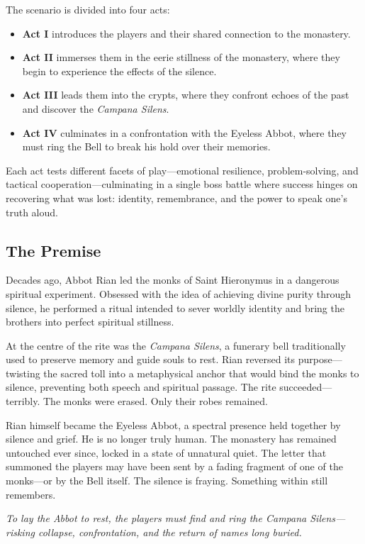 \documentclass[twocolumn,nodeprecatedcode,bg=print]{dndbook/dndbook}
\begin{document}
The scenario is divided into four acts: 
\begin{itemize}
    \item \textbf{Act I} introduces the players and their shared connection to the monastery.
    \item \textbf{Act II} immerses them in the eerie stillness of the monastery, where they begin to experience the effects of the silence.
    \item \textbf{Act III} leads them into the crypts, where they confront echoes of the past and discover the \emph{Campana Silens}.
    \item \textbf{Act IV} culminates in a confrontation with the Eyeless Abbot, where they must ring the Bell to break his hold over their memories.
\end{itemize}
Each act tests different facets of play—emotional resilience, problem-solving, and tactical cooperation—culminating in a single boss battle where success hinges on recovering what was lost: identity, remembrance, and the power to speak one’s truth aloud.

\subsection*{The Premise}
Decades ago, Abbot Rian led the monks of Saint Hieronymus in a dangerous spiritual experiment. Obsessed with the idea of achieving divine purity through silence, he performed a ritual intended to sever worldly identity and bring the brothers into perfect spiritual stillness.

At the centre of the rite was the \emph{Campana Silens}, a funerary bell traditionally used to preserve memory and guide souls to rest. Rian reversed its purpose—twisting the sacred toll into a metaphysical anchor that would bind the monks to silence, preventing both speech and spiritual passage. The rite succeeded—terribly. The monks were erased. Only their robes remained.

Rian himself became the Eyeless Abbot, a spectral presence held together by silence and grief. He is no longer truly human. The monastery has remained untouched ever since, locked in a state of unnatural quiet. The letter that summoned the players may have been sent by a fading fragment of one of the monks—or by the Bell itself. The silence is fraying. Something within still remembers.

\emph{To lay the Abbot to rest, the players must find and ring the Campana Silens—risking collapse, confrontation, and the return of names long buried.}
\end{document}
